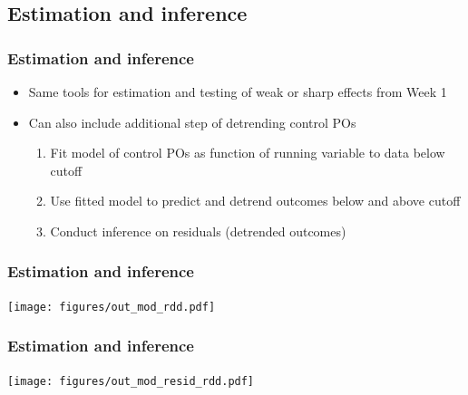\documentclass[table, xcolor = {dvipsnames}, 9pt]{beamer}
\theoremstyle{plain}
\begin{document}
\subsection{Estimation and inference}
\begin{frame}
\frametitle{Estimation and inference} 
\vfill
\begin{itemize} \vfill
\item Same tools for estimation and testing of weak or sharp effects from Week 1 \vfill
\item Can also include additional step of detrending control POs \\ \citep{saleshansenrowan2018,saleshansen2020} \vfill
\begin{enumerate} \vfill
\item Fit model of control POs as function of running variable to data below cutoff \vfill
\item Use fitted model to predict and detrend outcomes below and above cutoff \vfill
\item Conduct inference on residuals (detrended outcomes) \vfill
\end{enumerate} \vfill
\end{itemize} \vfill
\end{frame}
\begin{frame}
\frametitle{Estimation and inference} 
\vfill
\begin{center}
\texttt{[image: figures/out\_mod\_rdd.pdf]}
\end{center}
\vfill
\end{frame}
\begin{frame}
\frametitle{Estimation and inference} 
\vfill
\begin{center}
\texttt{[image: figures/out\_mod\_resid\_rdd.pdf]}
\end{center}
\vfill
\end{frame}
\end{document}

